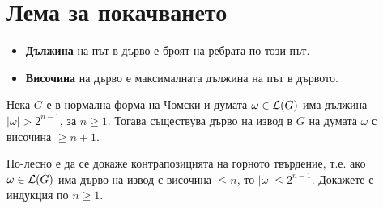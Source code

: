 \section{Лема за покачването}

\begin{itemize}
\item 
  {\bf Дължина} на път в дърво е броят на ребрата по този път.
\item
  {\bf Височина} на дърво е максималната дължина на път в дървото.
\end{itemize}


\begin{prop}
  \label{pr:height-tree}
  Нека $G$ е в нормална форма на Чомски и думата $\omega \in \mathcal{L}(G)$ има дължина $|\omega| > 2^{n-1}$, за $n \geq 1$.
  Тогава съществува дърво на извод в $G$ на думата $\omega$ с височина $\geq n+1$.
\end{prop}
\begin{hint}
  По-лесно е да се докаже контрапозицията на горното твърдение, т.е.
  ако $\omega \in \mathcal{L}(G)$ има дърво на извод с височина $\leq n$, то $|\omega| \leq 2^{n-1}$.
  Докажете с индукция по $n \geq 1$.
\end{hint}

